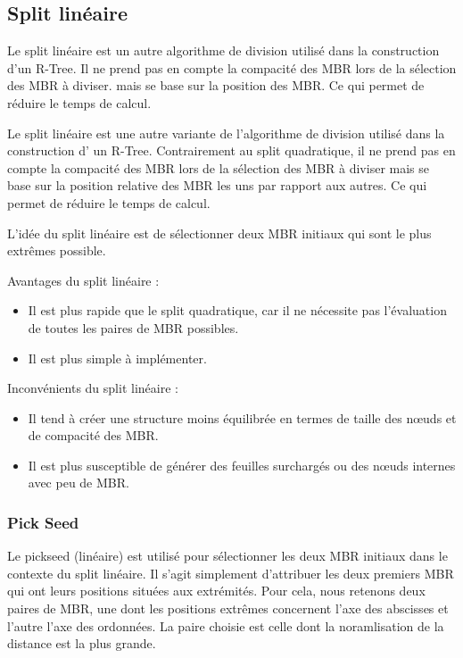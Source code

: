 \documentclass {article}
\begin{document}
\begin{verbatim}

\end{verbatim}



\subsection {Split linéaire}

Le split linéaire est un autre algorithme de division utilisé dans la construction d'un R-Tree. 
Il ne prend pas en compte la compacité des MBR lors de la sélection des MBR à diviser.
mais se base sur la position des MBR. Ce qui permet de réduire le temps de calcul.

Le split linéaire est une autre variante de l'algorithme de division utilisé dans la construction d'
un R-Tree. 
Contrairement au split quadratique, il ne prend pas en compte la compacité des MBR lors de la 
sélection des MBR à diviser mais se base sur la position relative des MBR les uns par rapport 
aux autres. 
Ce qui permet de réduire le temps de calcul.

L'idée du split linéaire est de sélectionner deux MBR initiaux qui sont le plus extrêmes possible.

Avantages du split linéaire :

\begin{itemize}
    \item Il est plus rapide que le split quadratique, car il ne nécessite pas l'évaluation de
	toutes les paires de MBR possibles.
    \item Il est plus simple à implémenter.

\end{itemize}
Inconvénients du split linéaire :

\begin{itemize}
    \item Il tend à créer une structure moins équilibrée en termes de taille des nœuds et de
	compacité des MBR.
    \item Il est plus susceptible de générer des feuilles surchargés ou des nœuds internes
	avec peu de MBR.

\end{itemize}

\subsubsection {Pick Seed}

Le pickseed (linéaire) est utilisé pour sélectionner les deux MBR initiaux dans le contexte du split linéaire. 
Il s'agit simplement d'attribuer les deux premiers MBR qui ont leurs positions situées aux extrémités. 
Pour cela, nous retenons deux paires de MBR, une dont les positions extrêmes concernent l'axe des abscisses et 
l'autre l'axe des ordonnées.
La paire choisie est celle dont la noramlisation de la distance est la plus grande.
\end{document}
